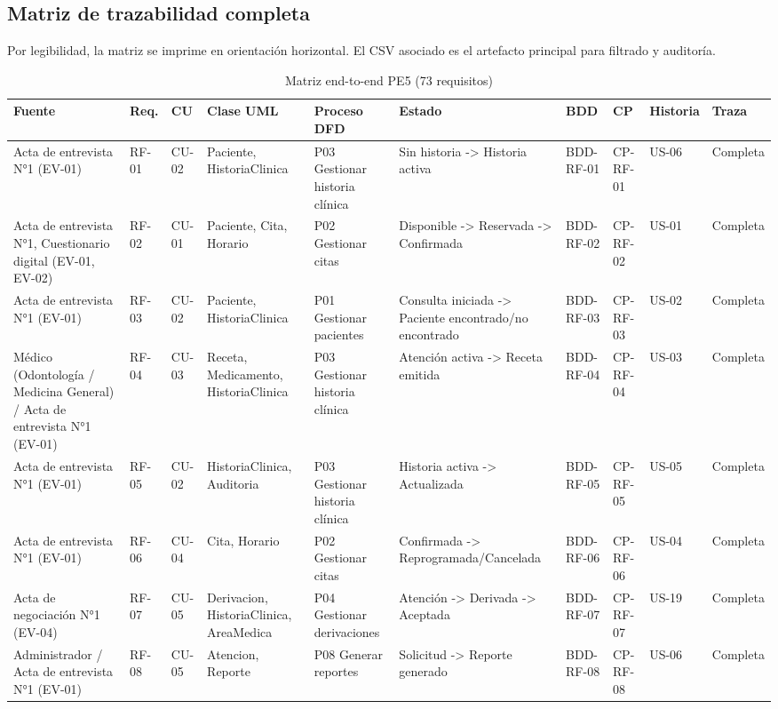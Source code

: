 \documentclass[11pt,a4paper]{article}
\begin{document}
\begin{appendices}
	\subsection{Matriz de trazabilidad completa}
	Por legibilidad, la matriz se imprime en orientación horizontal. El CSV asociado es el artefacto principal para filtrado y auditoría.
	\begin{landscape}\scriptsize
		\begin{longtable}{p{2.2cm}p{1.8cm}p{2cm}p{3cm}p{3cm}p{3cm}p{2cm}p{2cm}p{2cm}p{1.6cm}}
			\caption{Matriz end-to-end PE5 (73 requisitos)}\\\toprule
			\textbf{Fuente}&\textbf{Req.}&\textbf{CU}&\textbf{Clase UML}&\textbf{Proceso DFD}&\textbf{Estado}&\textbf{BDD}&\textbf{CP}&\textbf{Historia}&\textbf{Traza}\\\midrule\endhead
			Acta de entrevista N°1 (EV-01) & RF-01 & CU-02 & Paciente, HistoriaClinica & P03 Gestionar historia clínica & Sin historia -> Historia activa & BDD-RF-01 & CP-RF-01 & US-06 & Completa\\
			Acta de entrevista N°1, Cuestionario digital (EV-01, EV-02) & RF-02 & CU-01 & Paciente, Cita, Horario & P02 Gestionar citas & Disponible -> Reservada -> Confirmada & BDD-RF-02 & CP-RF-02 & US-01 & Completa\\
			Acta de entrevista N°1 (EV-01) & RF-03 & CU-02 & Paciente, HistoriaClinica & P01 Gestionar pacientes & Consulta iniciada -> Paciente encontrado/no encontrado & BDD-RF-03 & CP-RF-03 & US-02 & Completa\\
			Médico (Odontología / Medicina General) / Acta de entrevista N°1 (EV-01) & RF-04 & CU-03 & Receta, Medicamento, HistoriaClinica & P03 Gestionar historia clínica & Atención activa -> Receta emitida & BDD-RF-04 & CP-RF-04 & US-03 & Completa\\
			Acta de entrevista N°1 (EV-01) & RF-05 & CU-02 & HistoriaClinica, Auditoria & P03 Gestionar historia clínica & Historia activa -> Actualizada & BDD-RF-05 & CP-RF-05 & US-05 & Completa\\
			Acta de entrevista N°1 (EV-01) & RF-06 & CU-04 & Cita, Horario & P02 Gestionar citas & Confirmada -> Reprogramada/Cancelada & BDD-RF-06 & CP-RF-06 & US-04 & Completa\\
			Acta de negociación N°1 (EV-04) & RF-07 & CU-05 & Derivacion, HistoriaClinica, AreaMedica & P04 Gestionar derivaciones & Atención -> Derivada -> Aceptada & BDD-RF-07 & CP-RF-07 & US-19 & Completa\\
			Administrador / Acta de entrevista N°1 (EV-01) & RF-08 & CU-05 & Atencion, Reporte & P08 Generar reportes & Solicitud -> Reporte generado & BDD-RF-08 & CP-RF-08 & US-06 & Completa\\

\end{longtable}
\end{landscape}
\end{appendices}
\end{document}
